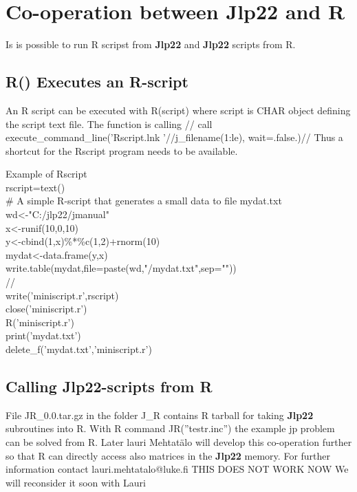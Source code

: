 \section{Co-operation between \textbf{Jlp22} and R}
\label{JR}
Is is possible to run R scripst from \textbf{Jlp22} and \textbf{Jlp22} scripts from R.
\subsection{ \textcolor{VioletRed}{R}() Executes an R-script}
\label{R}
An R script can be executed with \textcolor{VioletRed}{R}(script) where script is CHAR object
defining the script text file. The function is calling //
call execute\_command\_line('Rscript.lnk '//j\_filename(1:le), wait=.false.)//
Thus a shortcut for the Rscript program needs to be available.
\begin{example}[Rex]Example of Rscript\\
\label{Rex}
rscript=\textcolor{VioletRed}{text}()\\
\# A simple R-script that generates a small data to file mydat.txt\\
wd<-"C:/jlp22/jmanual"\\
x<-runif(10,0,10)\\
y<-cbind(1,x)\%*\%c(1,2)+rnorm(10)\\
mydat<-data.frame(y,x)\\
write.\textcolor{VioletRed}{table}(mydat,file=paste(wd,"/mydat.txt",sep=""))\\
//\\
\textcolor{VioletRed}{write}('miniscript.r',rscript)\\
\textcolor{VioletRed}{close}('miniscript.r')\\
\textcolor{VioletRed}{R}('miniscript.r')\\
\textcolor{VioletRed}{print}('mydat.txt')\\
\textcolor{VioletRed}{delete\_f}('mydat.txt','miniscript.r')
\end{example}
\subsection{Calling \textbf{Jlp22}-scripts from R}
\label{Rcalls}
File JR\_0.0.tar.gz in the folder J\_R contains R tarball for taking \textbf{Jlp22}  subroutines into R.
With R command JR(”testr.inc”) the example jp problem can be solved from R.
Later lauri Mehtat\"alo will develop this co-operation further so that R can directly access also
matrices in the \textbf{Jlp22} memory.
For further information contact lauri.mehtatalo@luke.fi
THIS DOES NOT WORK NOW We will reconsider it soon with Lauri
